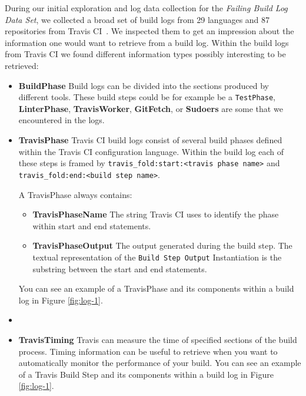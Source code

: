 \documentclass[\myrootdir/main.tex]{subfiles}
\begin{document}
During our initial exploration and log data collection for the \emph{Failing Build Log Data Set}, we collected a broad set of build logs from 29 languages and 87 repositories from Travis CI~\cite{travisci2019webpage}.
We inspected them to get an impression about the information one would want to retrieve from a build log.
Within the build logs from Travis CI we found different information types possibly interesting to be retrieved:

\begin{itemize}
	\item \textbf{BuildPhase} Build logs can be divided into the sections produced by different tools.
	      These build steps could be for example be a \texttt{TestPhase}, \textbf{LinterPhase}, \textbf{TravisWorker}, \textbf{GitFetch}, or \textbf{Sudoers} are some that we encountered in the logs.

	\item \textbf{TravisPhase} Travis CI build logs consist of several build phases defined within the Travis CI configuration language. Within the build log each of these steps is framed by \lstinline{travis_fold:start:<travis phase name>} and \\ \lstinline{travis_fold:end:<build step name>}.

	      A TravisPhase always contains:
	      \begin{itemize}
		      \item \textbf{TravisPhaseName} The string Travis CI uses to identify the phase within start and end statements.
		      \item \textbf{TravisPhaseOutput} The output generated during the build step. The textual representation of the \texttt{Build Step Output} Instantiation is the substring between the start and end statements.
	      \end{itemize}
	      You can see an example of a TravisPhase and its components within a build log in Figure \ref{fig:log-1}.

	\item
	\item \textbf{TravisTiming} Travis can measure the time of specified sections of the build process.
	      Timing information can be useful to retrieve when you want to automatically monitor the performance of your build.
	      You can see an example of a Travis Build Step and its components within a build log in Figure \ref{fig:log-1}.


\end{itemize}
\end{document}
